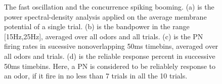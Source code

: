 \documentclass[12pt, a4paper]{article}
\begin{document}
\begin{figure}[htbp]\centering
    \hspace{0.5cm}

    \hspace{0.5cm}

\caption[Model]{\label{Figure1:model} \small The fast oscillation and the concurrence spiking booming. (a) is the power spectral-density analysis applied on the average membrane potential of a single trial. (b) is the bandpower in the range [15Hz,25Hz], averaged over all odors and all trials. (c) is the PN firing rates in sucessive nonoverlapping 50ms timebins, averaged over all odors and trials. (d) is the reliable response percent in successive 50ms timebins. Here, a PN is considered to be reliablely response to an odor, if it fire in no less than 7 trials in all the 10 trials.}
\end{figure}
\end{document}
